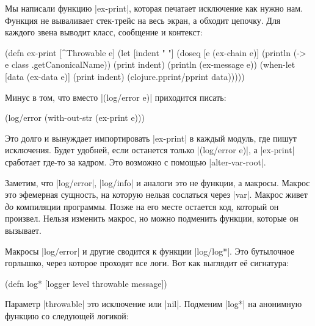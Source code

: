 Мы написали функцию \spverb|ex-print|, которая печатает исключение как нужно
нам. Функция не вываливает стек-трейс на весь экран, а обходит цепочку. Для
каждого звена выводит класс, сообщение и контекст:

\begin{english}
  \begin{clojure}
(defn ex-print
  [^Throwable e]
  (let [indent "  "]
    (doseq [e (ex-chain e)]
      (println (-> e class .getCanonicalName))
      (print indent)
      (println (ex-message e))
      (when-let [data (ex-data e)]
        (print indent)
        (clojure.pprint/pprint data)))))
  \end{clojure}
\end{english}

\noindent
Минус в том, что вместо \spverb|(log/error e)| приходится писать:

\begin{english}
  \begin{clojure}
(log/error (with-out-str (ex-print e)))
  \end{clojure}
\end{english}

\noindent
Это долго и вынуждает импортировать \spverb|ex-print| в каждый модуль, где пишут
исключения. Будет удобней, если останется только \spverb|(log/error e)|, а
\spverb|ex-print| сработает где-то за кадром. Это возможно с помощью
\spverb|alter-var-root|.

Заметим, что \spverb|log/error|, \spverb|log/info| и аналоги это не функции, а
макросы. Макрос это эфемерная сущность, на которую нельзя сослаться через
\spverb|var|. Макрос живет \emph{до} компиляции программы. Позже на его месте
остается код, который он произвел. Нельзя изменить макрос, но можно подменить
функции, которые он вызывает.


Макросы \spverb|log/error| и другие сводится к функции \spverb|log/log*|. Это
бутылочное горлышко, через которое проходят все логи. Вот как выглядит е\"{е}
сигнатура:

\begin{english}
  \begin{clojure}
(defn log* [logger level throwable message])
  \end{clojure}
\end{english}

Параметр \spverb|throwable| это исключение или \spverb|nil|. Подменим
\spverb|log*| на анонимную функцию со следующей логикой:

